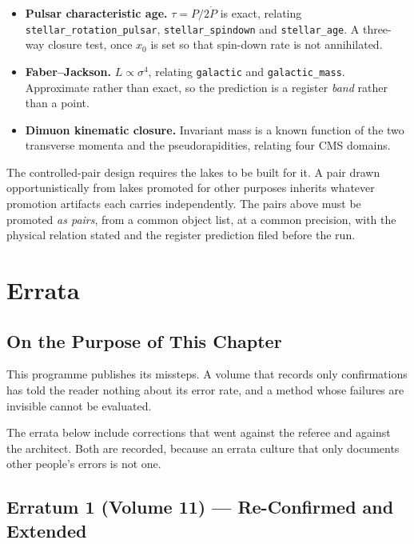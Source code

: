 \documentclass[11pt, letterpaper, openany]{book}
\begin{document}
\begin{itemize}
    \item \textbf{Pulsar characteristic age.} $\tau = P/2\dot{P}$ is exact, relating
          \texttt{stellar\_rotation\_pulsar}, \texttt{stellar\_spindown} and
          \texttt{stellar\_age}. A three-way closure test, once $x_0$ is set so that spin-down
          rate is not annihilated.
    \item \textbf{Faber--Jackson.} $L \propto \sigma^4$, relating \texttt{galactic} and
          \texttt{galactic\_mass}. Approximate rather than exact, so the prediction is a
          register \emph{band} rather than a point.
    \item \textbf{Dimuon kinematic closure.} Invariant mass is a known function of the two
          transverse momenta and the pseudorapidities, relating four CMS domains.
\end{itemize}

\begin{warningbox}
The controlled-pair design requires the lakes to be built for it. A pair drawn opportunistically
from lakes promoted for other purposes inherits whatever promotion artifacts each carries
independently. The pairs above must be promoted \emph{as pairs}, from a common object list, at
a common precision, with the physical relation stated and the register prediction filed before
the run.
\end{warningbox}

\chapter{Errata}

\section{On the Purpose of This Chapter}

This programme publishes its missteps. A volume that records only confirmations has told the
reader nothing about its error rate, and a method whose failures are invisible cannot be
evaluated.

The errata below include corrections that went against the referee and against the architect.
Both are recorded, because an errata culture that only documents other people's errors is not
one.

\section{Erratum 1 (Volume 11) --- Re-Confirmed and Extended}
\end{document}

